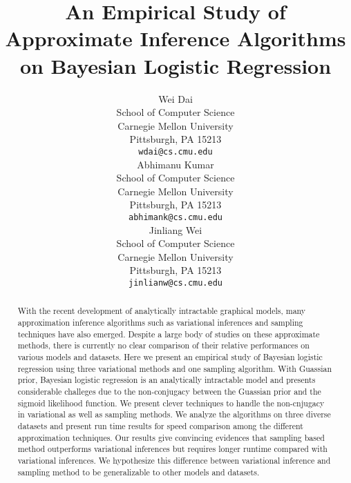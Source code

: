 \documentclass{article}
\title{An Empirical Study of Approximate Inference Algorithms on Bayesian
Logistic Regression}
\author{
Wei Dai \\
School of Computer Science \\
Carnegie Mellon University\\
Pittsburgh, PA 15213\\
\texttt{wdai@cs.cmu.edu}\\
\And
Abhimanu Kumar \\
School of Computer Science \\
Carnegie Mellon University\\
Pittsburgh, PA 15213\\
\texttt{abhimank@cs.cmu.edu}\\
\And
Jinliang Wei \\
School of Computer Science \\
Carnegie Mellon University\\
Pittsburgh, PA 15213\\
\texttt{jinlianw@cs.cmu.edu}\\
}
\begin{document}
\maketitle

\begin{abstract}

With the recent development of analytically intractable graphical models, many
approximation inference algorithms such as variational inferences and sampling
techniques have also emerged. Despite a large body of studies on these
approximate methods, there is currently no clear comparison of their relative
performances on various models and datasets.  Here we present an empirical
study of Bayesian logistic regression using three variational methods and one
sampling algorithm.  With Guassian prior, Bayesian logistic regression is an
analytically intractable model and presents considerable challeges due to the
non-conjugacy between the Guassian prior and the sigmoid likelihood function.
We present clever techniques to handle the non-cnjugacy in variational as well
as sampling methods. We analyze the algorithms on three diverse datasets and
present run time results for speed comparison among the different
approximation techniques. Our results give convincing evidences that sampling
based method outperforms variational inferences but requires longer runtime
compared with variational inferences.  We hypothesize this difference between
variational inference and sampling method to be generalizable to other models
and datasets.

\end{abstract}

\setcounter{page}{1}











\end{document}
